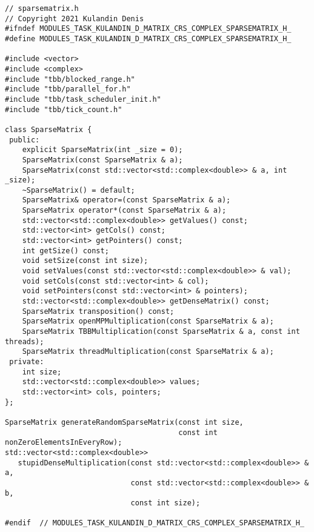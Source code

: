 \documentclass{report}
\begin{document}
\begin{lstlisting}
// sparsematrix.h
// Copyright 2021 Kulandin Denis
#ifndef MODULES_TASK_KULANDIN_D_MATRIX_CRS_COMPLEX_SPARSEMATRIX_H_
#define MODULES_TASK_KULANDIN_D_MATRIX_CRS_COMPLEX_SPARSEMATRIX_H_

#include <vector>
#include <complex>
#include "tbb/blocked_range.h"
#include "tbb/parallel_for.h"
#include "tbb/task_scheduler_init.h"
#include "tbb/tick_count.h"

class SparseMatrix {
 public:
    explicit SparseMatrix(int _size = 0);
    SparseMatrix(const SparseMatrix & a);
    SparseMatrix(const std::vector<std::complex<double>> & a, int _size);
    ~SparseMatrix() = default;
    SparseMatrix& operator=(const SparseMatrix & a);
    SparseMatrix operator*(const SparseMatrix & a);
    std::vector<std::complex<double>> getValues() const;
    std::vector<int> getCols() const;
    std::vector<int> getPointers() const;
    int getSize() const;
    void setSize(const int size);
    void setValues(const std::vector<std::complex<double>> & val);
    void setCols(const std::vector<int> & col);
    void setPointers(const std::vector<int> & pointers);
    std::vector<std::complex<double>> getDenseMatrix() const;
    SparseMatrix transposition() const;
    SparseMatrix openMPMultiplication(const SparseMatrix & a);
    SparseMatrix TBBMultiplication(const SparseMatrix & a, const int threads);
    SparseMatrix threadMultiplication(const SparseMatrix & a);
 private:
    int size;
    std::vector<std::complex<double>> values;
    std::vector<int> cols, pointers;
};

SparseMatrix generateRandomSparseMatrix(const int size,
                                        const int nonZeroElementsInEveryRow);
std::vector<std::complex<double>>
   stupidDenseMultiplication(const std::vector<std::complex<double>> & a,
                             const std::vector<std::complex<double>> & b,
                             const int size);

#endif  // MODULES_TASK_KULANDIN_D_MATRIX_CRS_COMPLEX_SPARSEMATRIX_H_
\end{lstlisting}
\end{document}
